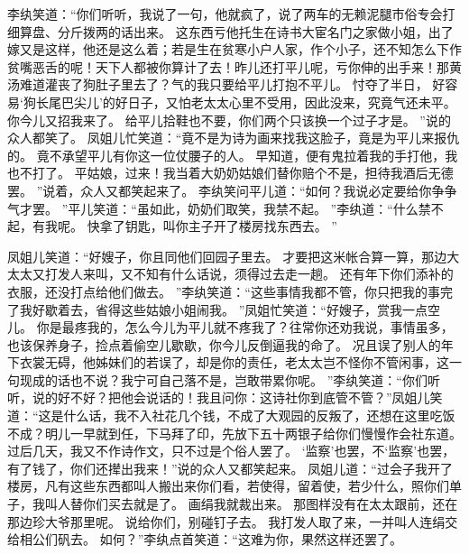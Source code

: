 李纨笑道：“你们听听，我说了一句，他就疯了，说了两车的无赖泥腿市俗专会打细算盘、分斤拨两的话出来。
这东西亏他托生在诗书大宦名门之家做小姐，出了嫁又是这样，他还是这么着；若是生在贫寒小户人家，作个小子，还不知怎么下作贫嘴恶舌的呢！天下人都被你算计了去！昨儿还打平儿呢，亏你伸的出手来！那黄汤难道灌丧了狗肚子里去了？气的我只要给平儿打抱不平儿。
忖夺了半日，
好容易‘狗长尾巴尖儿’的好日子，又怕老太太心里不受用，因此没来，究竟气还未平。
你今儿又招我来了。
给平儿拾鞋也不要，你们两个只该换一个过子才是。
”说的众人都笑了。
凤姐儿忙笑道：“竟不是为诗为画来找我这脸子，竟是为平儿来报仇的。
竟不承望平儿有你这一位仗腰子的人。
早知道，便有鬼拉着我的手打他，我也不打了。
平姑娘，过来！我当着大奶奶姑娘们替你赔个不是，担待我酒后无德罢。
”说着，众人又都笑起来了。
李纨笑问平儿道：“如何？我说必定要给你争争气才罢。
”平儿笑道：“虽如此，奶奶们取笑，我禁不起。
”李纨道：“什么禁不起，有我呢。
快拿了钥匙，叫你主子开了楼房找东西去。
”\par
凤姐儿笑道：“好嫂子，你且同他们回园子里去。
才要把这米帐合算一算，那边大太太又打发人来叫，又不知有什么话说，须得过去走一趟。
还有年下你们添补的衣服，还没打点给他们做去。
”李纨笑道：“这些事情我都不管，你只把我的事完了我好歇着去，省得这些姑娘小姐闹我。
”凤姐忙笑道：“好嫂子，赏我一点空儿。
你是最疼我的，怎么今儿为平儿就不疼我了？往常你还劝我说，事情虽多，也该保养身子，捡点着偷空儿歇歇，你今儿反倒逼我的命了。
况且误了别人的年下衣裳无碍，他姊妹们的若误了，却是你的责任，老太太岂不怪你不管闲事，这一句现成的话也不说？我宁可自己落不是，岂敢带累你呢。
”李纨笑道：“你们听听，说的好不好？把他会说话的！我且问你：这诗社你到底管不管？”凤姐儿笑道：“这是什么话，我不入社花几个钱，不成了大观园的反叛了，还想在这里吃饭不成？明儿一早就到任，下马拜了印，先放下五十两银子给你们慢慢作会社东道。
过后几天，我又不作诗作文，只不过是个俗人罢了。
‘监察’也罢，不‘监察’也罢，有了钱了，你们还撵出我来！”说的众人又都笑起来。
凤姐儿道：“过会子我开了楼房，凡有这些东西都叫人搬出来你们看，若使得，留着使，若少什么，照你们单子，我叫人替你们买去就是了。
画绢我就裁出来。
那图样没有在太太跟前，还在那边珍大爷那里呢。
说给你们，别碰钉子去。
我打发人取了来，一并叫人连绢交给相公们矾去。
如何？”李纨点首笑道：“这难为你，果然这样还罢了。
